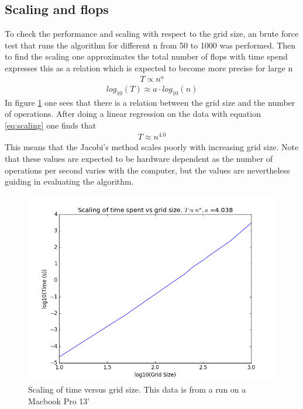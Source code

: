 \documentclass[a4paper,11pt]{article}
\begin{document}
{\subsection{Scaling and flops}
To check the performance and scaling with respect to the grid size, an brute force test that runs the algorithm for different n from 50 to 1000 was performed. Then to find the scaling one approximates the total number of flops with time spend expresses this as a relation which is expected to become more precise for large n
\begin{align}
	T \propto n^{a} 
\end{align}
\begin{align}
	log_{10}(T) \approx a\cdot log_{10}(n)
	\label{eq:scaling}
\end{align}
In figure \ref{fig:scaling} one sees that there is a relation between the grid size and the number of operations. After doing a linear regression on the data with equation \ref{eq:scaling} one finds that 
\begin{align}
	T \approx n^{4.0}
\end{align}
This means that the Jacobi's method scales poorly with increasing grid size. Note that these values are expected to be hardware dependent as the number of operations per second varies with the computer, but the values are nevertheless guiding in evaluating the algorithm. 
\begin{figure}
	\centering
	\includegraphics[scale=0.6]{Project2_scaling_time}
	\caption{Scaling of time versus grid size. This data is from a run on a Macbook Pro 13' }
	\label{fig:scaling}
\end{figure}

}
\end{document}

